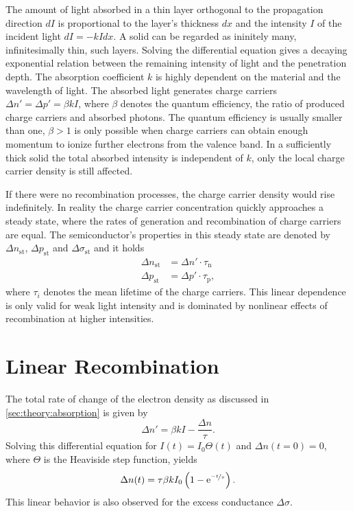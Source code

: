 The amount of light absorbed in a thin layer orthogonal to the propagation direction $dI$ is proportional to the layer's thickness $dx$ and the intensity $I$ of the incident light $dI = - k I dx$.
A solid can be regarded as ininitely many, infinitesimally thin, such layers.
Solving the differential equation gives a decaying exponential relation between the remaining intensity of light and the penetration depth.
The absorption coefficient $k$ is highly dependent on the material and the wavelength of light.
The absorbed light generates charge carriers $\Delta n' = \Delta p' = \beta k I$, where $\beta$ denotes the quantum efficiency, the ratio of produced charge carriers and absorbed photons.
The quantum efficiency is usually smaller than one, $\beta > 1$ is only possible when charge carriers can obtain enough momentum to ionize further electrons from the valence band.
In a sufficiently thick solid the total absorbed intensity is independent of $k$, only the local charge carrier density is still affected.

If there were no recombination processes, the charge carrier density would rise indefinitely.
In reality the charge carrier concentration quickly approaches a steady state, where the rates of generation and recombination of charge carriers are equal.
The semiconductor's properties in this steady state are denoted by $\Delta n_\text{st}$, $\Delta p_\text{st}$ and $\Delta \sigma_\text{st}$ and it holds
\begin{align*}
	\Delta n_\text{st} &= \Delta n' \cdot \tau_\text{n} \\
	\Delta p_\text{st} &= \Delta p' \cdot \tau_\text{p},
\end{align*}
where $\tau_i$ denotes the mean lifetime of the charge carriers.
This linear dependence is only valid for weak light intensity and is dominated by nonlinear effects of recombination at higher intensities.

\section{Linear Recombination}
The total rate of change of the electron density as discussed in \autoref{sec:theory:absorption} is given by
\begin{equation*}
	\Delta n' = \beta k I - \frac{\Delta n}{\tau}.
\end{equation*}
Solving this differential equation for $I(t) = I_0 \Theta (t)$ and $\Delta n (t = 0) = 0$, where $\Theta$ is the Heaviside step function, yields
\begin{equation}
	\Delta n (t) = \tau \beta k I_0 \left(1 - \mathrm{e}^{\nicefrac{-t}{\tau}}\right).
\end{equation}
This linear behavior is also observed for the excess conductance $\Delta \sigma$.

